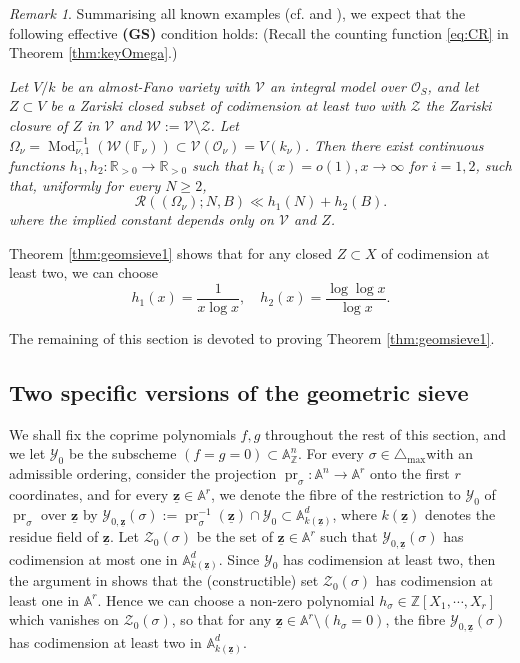 \documentclass[11pt,letterpaper]{amsart}
\newcommand{\BA}{{\mathbb {A}}}
\newcommand{\BF}{{\mathbb {F}}}
\newcommand{\BR}{{\mathbb {R}}}
\newcommand{\BZ}{{\mathbb {Z}}}
\newcommand{\CO}{{\mathcal {O}}}
\newcommand{\CR}{{\mathcal {R}}}
\newcommand{\CV}{{\mathcal {V}}}
\newcommand{\CW}{{\mathcal {W}}}
\newcommand{\CY}{{\mathcal {Y}}}
\newcommand{\CZ}{{\mathcal {Z}}}
\newcommand{\zz}{\underline{\mathbf{z}}}
\theoremstyle{plain}
\numberwithin{equation}{section}
\theoremstyle{definition}
\theoremstyle{remark}
\newtheorem{remark}[theorem]{Remark}
\begin{document}
\begin{remark}\label{re:effectiveGS}
	Summarising all known examples (cf. \cite{Ekedahl,Browning-HB} and  \cite[Theorem 3.1 (ii) and its Remarks]{Cao-Huang2}), we expect  that the following effective \textbf{(GS)} condition holds: (Recall the counting function \eqref{eq:CR} in Theorem \ref{thm:keyOmega}.) 
	
	\emph{Let $V/k$ be an almost-Fano variety with $\CV$ an integral model over $\CO_S$, and let $Z\subset V$  be a Zariski closed subset of codimension at least two with $\CZ$ the Zariski closure of $Z$ in $\CV$ and $\CW:=\CV\setminus\CZ$. 
		Let $\Omega_{\nu}=\operatorname{Mod}_{\nu,1}^{-1}\left(\CW(\BF_\nu)\right)\subset \CV(\CO_{\nu})=V(k_\nu)$. 
		Then there exist continuous functions $h_1,h_2:\BR_{>0}\to\BR_{>0}$ such that $h_i(x)=o(1),x\to\infty$ for $i=1,2$, such that, uniformly for every $N\geqslant 2$,
			$$\CR((\Omega_\nu);N,B)\ll h_1(N)+h_2(B).$$
		where the implied constant depends only on $\CV$ and $Z$.}
	
	Theorem \ref{thm:geomsieve1} shows that for any closed $Z\subset X$ of codimension at least two, we can choose 
	$$h_1(x)=\frac{1}{x\log x},\quad h_2(x)=\frac{\log\log x}{\log x}.$$
\end{remark}
The remaining of this section is devoted to proving Theorem \ref{thm:geomsieve1}.
\subsection{Two specific versions of the geometric sieve} 	
We shall fix the coprime polynomials $f,g$ throughout the rest of this section, and we let $\CY_0$ be the subscheme $(f=g=0)\subset\BA^n_\BZ$. 
For every $\sigma\in\triangle_{\max}$with an admissible ordering, consider the projection $\operatorname{pr}_\sigma:\BA^n\to\BA^r$ onto the first $r$ coordinates, and for every $\zz\in \BA^r$, we denote the fibre of the restriction to $\CY_0$ of $\operatorname{pr}_\sigma$ over $\zz$ by $\CY_{0,\zz}(\sigma):=\operatorname{pr}_\sigma^{-1}(\zz)\cap \CY_0\subset \BA_{k(\zz)}^d$, where $k(\zz)$ denotes the residue field of $\zz$. Let $\CZ_0(\sigma)$  be the set of $\zz\in \BA^r$ such that $\CY_{0,\zz}(\sigma)$ has codimension at most one in $\BA_{k(\zz)}^{d}$. Since $\CY_0$ has codimension at least two, then the argument in \cite[p. 360 Middle paragraph]{Poonen} shows that the (constructible) set $\CZ_0(\sigma)$ has codimension at least one in $\BA^r$.  Hence we can choose a non-zero polynomial $h_\sigma\in\BZ[X_1,\cdots,X_r]$ which vanishes on $\CZ_0(\sigma)$, so that for any $\zz\in\BA^r\setminus (h_\sigma=0)$, the fibre $\CY_{0,\zz}(\sigma)$ has codimension at least two in $ \BA_{k(\zz)}^d$.
\end{document}
